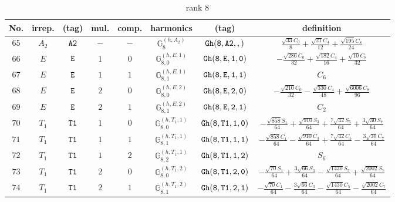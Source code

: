 \documentclass[fleqn,8pt]{jsarticle}
\begin{document}
\begin{table}[ht!]
\begin{center}
\caption{rank 8}
\renewcommand{\arraystretch}{1.3}
\begin{tabular}{cccccccc} \hline \hline
No. & irrep. & (tag) & mul. & comp. & harmonics & (tag) & definition \\ \hline
$ 65 $ & $ A_{2} $ & $ {\tt A2} $ & $ - $ & $ - $ & $ \mathbb{G}_{8}^{(h,A_{2})} $ & $ {\tt Gh(8,A2,,)} $ & $ \frac{\sqrt{33} C_{0}}{8} + \frac{\sqrt{21} C_{4}}{12} + \frac{\sqrt{195} C_{8}}{24} $ \\
$ 66 $ & $ E $ & $ {\tt E} $ & $ 1 $ & $ 0 $ & $ \mathbb{G}_{8,0}^{(h,E,1)} $ & $ {\tt Gh(8,E,1,0)} $ & $ - \frac{\sqrt{286} C_{0}}{32} + \frac{\sqrt{182} C_{4}}{16} + \frac{\sqrt{10} C_{8}}{32} $ \\
$ 67 $ & $ E $ & $ {\tt E} $ & $ 1 $ & $ 1 $ & $ \mathbb{G}_{8,1}^{(h,E,1)} $ & $ {\tt Gh(8,E,1,1)} $ & $ C_{6} $ \\
$ 68 $ & $ E $ & $ {\tt E} $ & $ 2 $ & $ 0 $ & $ \mathbb{G}_{8,0}^{(h,E,2)} $ & $ {\tt Gh(8,E,2,0)} $ & $ - \frac{\sqrt{210} C_{0}}{32} - \frac{\sqrt{330} C_{4}}{48} + \frac{\sqrt{6006} C_{8}}{96} $ \\
$ 69 $ & $ E $ & $ {\tt E} $ & $ 2 $ & $ 1 $ & $ \mathbb{G}_{8,1}^{(h,E,2)} $ & $ {\tt Gh(8,E,2,1)} $ & $ C_{2} $ \\
$ 70 $ & $ T_{1} $ & $ {\tt T1} $ & $ 1 $ & $ 0 $ & $ \mathbb{G}_{8,0}^{(h,T_{1},1)} $ & $ {\tt Gh(8,T1,1,0)} $ & $ - \frac{\sqrt{858} S_{1}}{64} + \frac{\sqrt{910} S_{3}}{64} + \frac{7 \sqrt{42} S_{5}}{64} + \frac{3 \sqrt{30} S_{7}}{64} $ \\
$ 71 $ & $ T_{1} $ & $ {\tt T1} $ & $ 1 $ & $ 1 $ & $ \mathbb{G}_{8,1}^{(h,T_{1},1)} $ & $ {\tt Gh(8,T1,1,1)} $ & $ - \frac{\sqrt{858} C_{1}}{64} - \frac{\sqrt{910} C_{3}}{64} + \frac{7 \sqrt{42} C_{5}}{64} - \frac{3 \sqrt{30} C_{7}}{64} $ \\
$ 72 $ & $ T_{1} $ & $ {\tt T1} $ & $ 1 $ & $ 2 $ & $ \mathbb{G}_{8,2}^{(h,T_{1},1)} $ & $ {\tt Gh(8,T1,1,2)} $ & $ S_{6} $ \\
$ 73 $ & $ T_{1} $ & $ {\tt T1} $ & $ 2 $ & $ 0 $ & $ \mathbb{G}_{8,0}^{(h,T_{1},2)} $ & $ {\tt Gh(8,T1,2,0)} $ & $ - \frac{\sqrt{70} S_{1}}{64} + \frac{3 \sqrt{66} S_{3}}{64} - \frac{\sqrt{1430} S_{5}}{64} + \frac{\sqrt{2002} S_{7}}{64} $ \\
$ 74 $ & $ T_{1} $ & $ {\tt T1} $ & $ 2 $ & $ 1 $ & $ \mathbb{G}_{8,1}^{(h,T_{1},2)} $ & $ {\tt Gh(8,T1,2,1)} $ & $ - \frac{\sqrt{70} C_{1}}{64} - \frac{3 \sqrt{66} C_{3}}{64} - \frac{\sqrt{1430} C_{5}}{64} - \frac{\sqrt{2002} C_{7}}{64} $ \\

\end{tabular}
\end{center}
\end{table}
\end{document}
